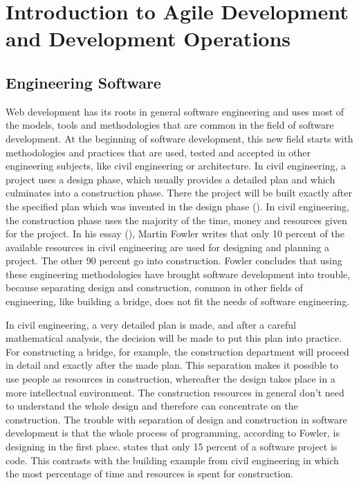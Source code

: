 \newpage

\section{Introduction to Agile Development and Development Operations}
\label{section:Introduction to Agile Development and Development Operations}

\subsection{Engineering Software}
Web development has its roots in general software engineering and uses most of the models, tools and methodologies that are
common in the field of software development. At the beginning of software development, this new field starts with methodologies
and practices that are used, tested and accepted in other engineering subjects, like civil engineering or architecture. In civil engineering,
a project uses a design phase, which usually provides a detailed plan and which culminates into a construction phase. There the project
will be built exactly after the specified plan which was invented in the design phase (\cite{lindstrom2004extreme}).
In civil engineering, the construction phase uses the majority of the time, money and resources given for the project.
In his essay (\cite{fowler2001new}), Martin Fowler writes that only 10 percent of the available resources in civil engineering are used for
designing and planning a project. The other 90 percent go into construction. Fowler concludes that using these engineering methodologies have
brought software development into trouble, because separating design and construction, common in other fields of engineering, like building
a bridge, does not fit the needs of software engineering.

In civil engineering, a very detailed plan is made, and after a careful mathematical analysis, the decision will be made to put this plan into practice. For constructing a bridge,
for example, the construction department will proceed in detail and exactly after the made plan.
This separation makes it possible to use people as resources in construction, whereafter the design takes place in a more
intellectual environment. The construction resources in general don't need to understand the whole design and therefore can concentrate on
the construction. The trouble with separation of design and construction in software development is that the whole process of programming, according to Fowler, is designing in the first place. \cite{opac-b1105529} states that only 15 percent of a software project is code.
This contrasts with the building example from civil engineering in which the most percentage of time and resources is spent for construction.

